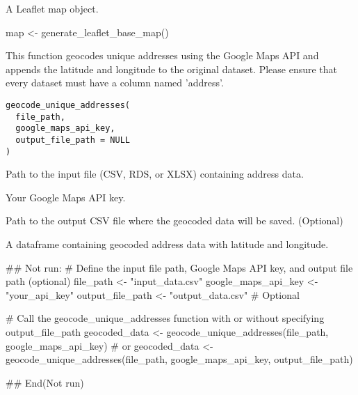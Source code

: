 \documentclass[a4paper]{book}
\begin{document}
%
\begin{Value}
A Leaflet map object.
\end{Value}
%
\begin{Examples}
\begin{ExampleCode}
map <- generate_leaflet_base_map()
\end{ExampleCode}
\end{Examples}
%
\begin{Description}
This function geocodes unique addresses using the Google Maps API and appends the
latitude and longitude to the original dataset. Please ensure that every dataset
must have a column named 'address'.
\end{Description}
%
\begin{Usage}
\begin{verbatim}
geocode_unique_addresses(
  file_path,
  google_maps_api_key,
  output_file_path = NULL
)
\end{verbatim}
\end{Usage}
%
\begin{Arguments}
\begin{ldescription}
\item[\code{file\_path}] Path to the input file (CSV, RDS, or XLSX) containing address data.

\item[\code{google\_maps\_api\_key}] Your Google Maps API key.

\item[\code{output\_file\_path}] Path to the output CSV file where the geocoded data will be saved. (Optional)
\end{ldescription}
\end{Arguments}
%
\begin{Value}
A dataframe containing geocoded address data with latitude and longitude.
\end{Value}
%
\begin{Examples}
\begin{ExampleCode}
## Not run: 
# Define the input file path, Google Maps API key, and output file path (optional)
file_path <- "input_data.csv"
google_maps_api_key <- "your_api_key"
output_file_path <- "output_data.csv"  # Optional

# Call the geocode_unique_addresses function with or without specifying output_file_path
geocoded_data <- geocode_unique_addresses(file_path, google_maps_api_key)
# or
geocoded_data <- geocode_unique_addresses(file_path, google_maps_api_key, output_file_path)

## End(Not run)

\end{ExampleCode}
\end{Examples}
\end{document}
